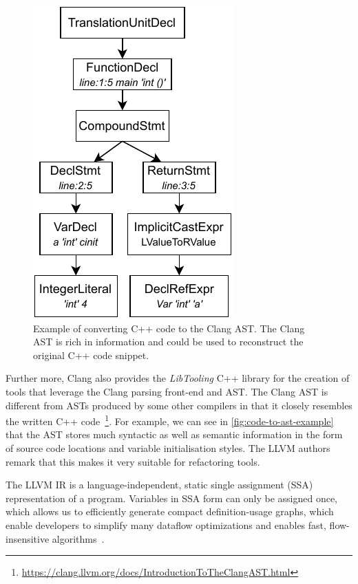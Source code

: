 \documentclass{mpaper}
\begin{document}
    \begin{figure}
        \centering
        \inputminted{c++}{code/code-to-ast.cpp}
        \includegraphics{images/code-to-ast.pdf}
        \caption{Example of converting C++ code to the Clang AST. The Clang AST is rich in information and could be used to reconstruct the original C++ code snippet.}
        \label{fig:code-to-ast-example}
    \end{figure}
    
    Further more, Clang also provides the \emph{LibTooling} C++ library for the creation of tools that leverage the Clang parsing front-end and AST.
    The Clang AST is different from ASTs produced by some other compilers in that it closely resembles the written C++ code~\footnote{\url{https://clang.llvm.org/docs/IntroductionToTheClangAST.html}}.
    For example, we can see in \autoref{fig:code-to-ast-example} that the AST stores much syntactic as well as semantic information in the form of source code locations and variable initialisation styles.
    The LLVM authors remark that this makes it very suitable for refactoring tools.
    
    The LLVM IR is a language-independent, static single assignment (SSA)~\cite{Rosen1988} representation of a program.
    Variables in SSA form can only be assigned once, which allows us to efficiently generate compact definition-usage graphs, which enable developers to simplify many dataflow optimizations and enables fast, flow-insensitive algorithms~\cite{Lattner2004}.
    
\end{document}
